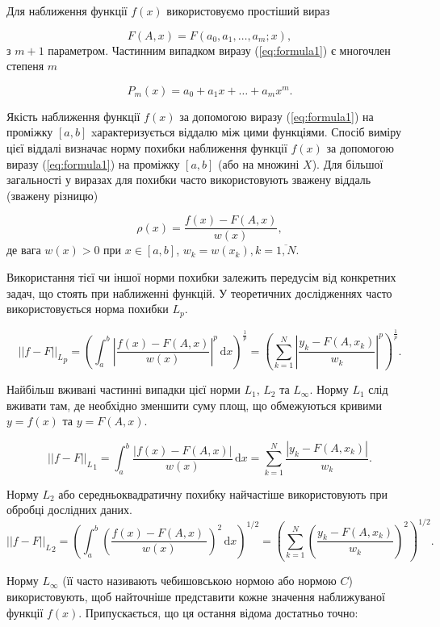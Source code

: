 \documentclass[ukrainian,14pt]{extarticle}
\begin{document}
Для наближення функції $f(x)$ використовуємо простіший вираз

\begin{equation}\label{eq:formula1}
F(A,x) = F(a_0, a_1,\ldots, a_m; x),
\end{equation}з $m+1$ параметром. Частинним випадком виразу (\ref{eq:formula1}) є многочлен степеня $m$

\begin{equation}\label{eq:formula2}
P_m(x) = a_0 + a_1x + \ldots + a_mx^m.
\end{equation}

Якість наближення функції $f(x)$ за допомогою виразу (\ref{eq:formula1}) на проміжку $[a,b]$ xарактеризується віддалю між цими функціями. Спосіб виміру цієї віддалі визначає норму похибки наближення функції $f(x)$ за допомогою виразу (\ref{eq:formula1}) на проміжку $[a,b]$ (або на множині $X$). Для більшої загальності у виразах для похибки часто використовують зважену віддаль (зважену різницю)

\begin{equation}\label{eq:formula3}
\rho(x) = \frac{f(x) - F(A, x)}{w(x)},
\end{equation}
де вага $w(x)>0$ при $x \in [a,b]$, $w_k=w(x_k), k=\overline{1,N}$.

Використання тієї чи іншої норми похибки залежить передусім від конкретних задач, що стоять при наближенні функцій. У теоретичних дослідженнях часто використовується норма похибки $L_p$.

$${||f-F||_L}_p = \left(\int_a^b \! \left|\frac{f(x) - F(A,x)}{w(x)}\right|^p \, \mathrm{d}x
 \right)^{\frac{1}{p}} = \left( \sum_{k=1}^N \left| \frac{y_k-F(A, x_k)}{w_k} \right|^p  \right)^{\frac{1}{p}}.$$

Найбільш вживані частинні випадки цієї норми $L_1$, $L_2$ та $L_\infty$.
Норму $L_1$ слід вживати там, де необхідно зменшити суму площ, що обмежуються кривими $y = f(x)$ та $y = F(A, x)$.

$${||f-F||_L}_1 = \int_a^b \! \frac{ \left| f(x) - F(A,x) \right| }{w(x)} \, \mathrm{d}x
  = \sum_{k=1}^N  \frac{ \left| y_k-F(A, x_k)  \right| }{w_k}.$$
 
 
Норму $L_2$ або середньоквадратичну похибку найчастіше використовують при обробці дослідних даних.
 $${||f-F||_L}_2 = \left(\int_a^b \! \left( \frac{f(x) - F(A,x) \ }{w(x)} \right)^{2} \, \mathrm{d}x
 \right)^{1/2} = \left( \sum_{k=1}^N  \left( \frac{  y_k-F(A, x_k)   }{w_k}\right)^{2}  \right)^{1/2}.$$
 
Норму $L_{\infty}$ (її часто називають чебишовською нормою або нормою $C$) використовують, щоб найточніше представити кожне значення наближуваної функції $f(x)$. Припускається, що ця остання відома достатньо точно:
\end{document}
